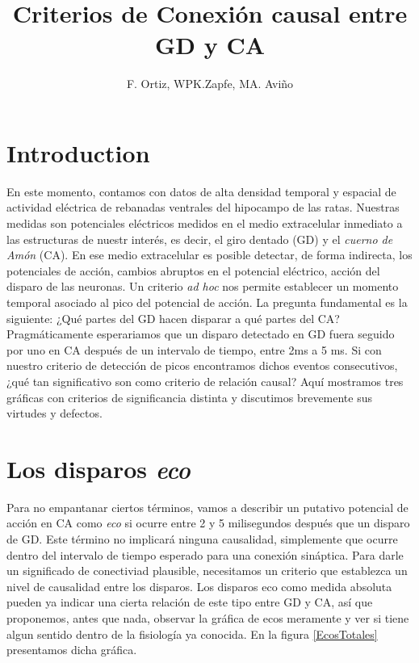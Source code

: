 \documentclass{article}
\title{Criterios de Conexión causal entre GD y CA}
\author{F. Ortiz,  WPK.Zapfe,  MA. Aviño }
\begin{document}
\maketitle


\section{Introduction}

En este momento, contamos con datos de alta densidad temporal
y espacial de actividad eléctrica de rebanadas ventrales del 
hipocampo de las ratas. Nuestras medidas son potenciales eléctricos
medidos en el medio extracelular inmediato a las estructuras de nuestr
interés, es decir, el giro dentado (GD) y el \emph{cuerno de Amón} (CA). 
En ese medio extracelular es posible detectar, de forma indirecta,
los potenciales de acción, cambios abruptos en el potencial
eléctrico, acción del disparo de las neuronas. Un criterio \emph{ad hoc}
nos permite establecer un momento temporal asociado al pico
del potencial de acción. La pregunta fundamental es la siguiente:
¿Qué partes del GD hacen disparar a qué partes del CA? 
Pragmáticamente esperariamos que un disparo detectado en GD fuera seguido
por uno en CA después de un intervalo de tiempo, entre 2ms  a 5 ms.  
Si con nuestro criterio de detección de picos encontramos dichos eventos
consecutivos, ¿qué tan significativo son como criterio de relación causal?
Aquí mostramos tres gráficas con criterios de significancia distinta y 
discutimos brevemente sus virtudes y defectos.

\section{Los disparos \emph{eco}}

Para no empantanar ciertos términos, vamos a describir un putativo
potencial de acción en CA como \emph{eco} si ocurre entre 
2 y 5 milisegundos después que un disparo de GD. Este término
no implicará ninguna causalidad, simplemente que ocurre dentro
del intervalo de tiempo esperado para una conexión sináptica.
Para darle un significado de conectiviad plausible, necesitamos
un criterio que establezca un nivel de causalidad entre los disparos.
Los disparos eco como medida absoluta pueden ya indicar una cierta
relación de este tipo entre GD y CA, así que proponemos, antes
que nada, observar la gráfica de ecos meramente y ver si tiene
algun sentido dentro de la fisiología ya conocida. En la figura 
\ref{EcosTotales} presentamos dicha gráfica. 
\end{document}
